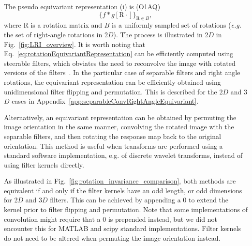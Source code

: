 \documentclass[fleqn,a4paper,oneside,openany]{book}
\newcommand\textid[1]{{\normalsize{\idfont #1}}}
\begin{document}
The pseudo equivariant representation (i) is (\textid{O1AQ})
\begin{equation}\label{eq:rotationEquivariantRepresentation}
    \{ f\ast g[\mathrm{R}\cdot]\}_{\mathrm{R}\in B},
\end{equation}
where $\mathrm{R}$ is a rotation matrix and $B$ is a uniformly sampled set of rotations (\textit{e.g.} the set of right-angle rotations in 2$D$).
The process is illustrated in 2$D$ in Fig.~\ref{fig:LRI_overview}.
It is worth noting that Eq.~\eqref{eq:rotationEquivariantRepresentation} can be efficiently computed using steerable filters, which obviates the need to reconvolve the image with rotated versions of the filters~\cite{WHS2018,AFO2019}. 
%
In the particular case of separable filters and right angle rotations, the equivariant representation can be efficiently obtained using unidimensional filter flipping and permutation. This is described for the 2$D$ and 3$D$ cases in Appendix~\ref{app:separableConvRightAngleEquivariant}.

Alternatively, an equivariant representation can be obtained by permuting the image orientation in the same manner, convolving the rotated image with the separable filters, and then rotating the response map back to the original orientation.
This method is useful when transforms are performed using a standard software implementation, e.g. of discrete wavelet transforms, instead of using filter kernels directly.

As illustrated in Fig.~\ref{fig:rotation_invariance_comparison}, both methods are equivalent if and only if the filter kernels have an odd length, or odd dimensions for 2$D$ and 3$D$ filters. This can be achieved by appending a $0$ to extend the kernel prior to filter flipping and permutation. Note that some implementations of convolution might require that a $0$ is prepended instead, but we did not encounter this for MATLAB and scipy standard implementations. 
Filter kernels do not need to be altered when permuting the image orientation instead.
\end{document}
